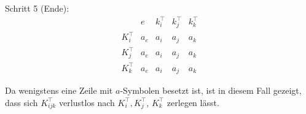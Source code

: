 \begin{tcolorbox}[excursusbox,title={Nachweis der verlustfreien Zerlegung anhand $K^\top_i, K^\top_j, K^\top_k$}]
    \medskip
    Schritt 5 (Ende):
    \[
        \begin{array}{c|cccc}
            & e & k^{\top}_i & k^{\top}_j & k^{\top}_k \\
            \hline
            K^{\top}_i     & a_e & a_i & a_j & a_k \\
            K^{\top}_j     & a_e & a_i & a_j & a_k \\
            K^{\top}_k     & a_e & a_i & a_j & a_k
        \end{array}
    \]

    \bigskip
    \noindent
    Da wenigstens eine Zeile mit $a$-Symbolen besetzt ist, ist in diesem Fall gezeigt, dass sich $K^\top_{ijk}$ verlustlos nach $K^{\top}_i, K^{\top}_j$, $K^{\top}_k$ zerlegen lässt.
\end{tcolorbox}
